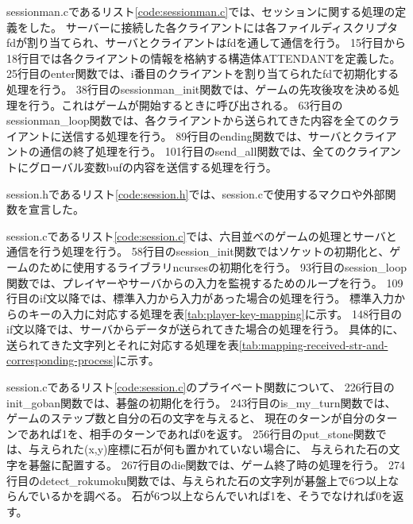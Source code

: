 \documentclass[a4j, titlepage, 10pt]{jsarticle}
\begin{document}
sessionman.cであるリスト\ref{code:sessionman.c}では、セッションに関する処理の定義をした。
サーバーに接続した各クライアントには各ファイルディスクリプタfdが割り当てられ、サーバとクライアントはfdを通して通信を行う。
15行目から18行目では各クライアントの情報を格納する構造体ATTENDANTを定義した。
25行目のenter関数では、i番目のクライアントを割り当てられたfdで初期化する処理を行う。
38行目のsessionman\_init関数では、ゲームの先攻後攻を決める処理を行う。これはゲームが開始するときに呼び出される。
63行目のsessionman\_loop関数では、各クライアントから送られてきた内容を全てのクライアントに送信する処理を行う。
89行目のending関数では、サーバとクライアントの通信の終了処理を行う。
101行目のsend\_all関数では、全てのクライアントにグローバル変数bufの内容を送信する処理を行う。

\lstset{ numbers = left }


session.hであるリスト\ref{code:session.h}では、session.cで使用するマクロや外部関数を宣言した。

\lstset{ numbers = left }


session.cであるリスト\ref{code:session.c}では、六目並べのゲームの処理とサーバと通信を行う処理を行う。
58行目のsession\_init関数ではソケットの初期化と、ゲームのために使用するライブラリncursesの初期化を行う。
93行目のsession\_loop関数では、プレイヤーやサーバからの入力を監視するためのループを行う。
109行目のif文以降では、標準入力から入力があった場合の処理を行う。
標準入力からのキーの入力に対応する処理を表\ref{tab:player-key-mapping}に示す。
148行目のif文以降では、サーバからデータが送られてきた場合の処理を行う。
具体的に、送られてきた文字列とそれに対応する処理を表\ref{tab:mapping-received-str-and-corresponding-process}に示す。

session.cであるリスト\ref{code:session.c}のプライベート関数について、
226行目のinit\_goban関数では、碁盤の初期化を行う。
243行目のis\_my\_turn関数では、ゲームのステップ数と自分の石の文字を与えると、
現在のターンが自分のターンであれば1を、相手のターンであれば0を返す。
256行目のput\_stone関数では、与えられた(x,y)座標に石が何も置かれていない場合に、
与えられた石の文字を碁盤に配置する。
267行目のdie関数では、ゲーム終了時の処理を行う。
274行目のdetect\_rokumoku関数では、与えられた石の文字列が碁盤上で6つ以上ならんでいるかを調べる。
石が6つ以上ならんでいれば1を、そうでなければ0を返す。

\lstset{ numbers = left }

\end{document}
